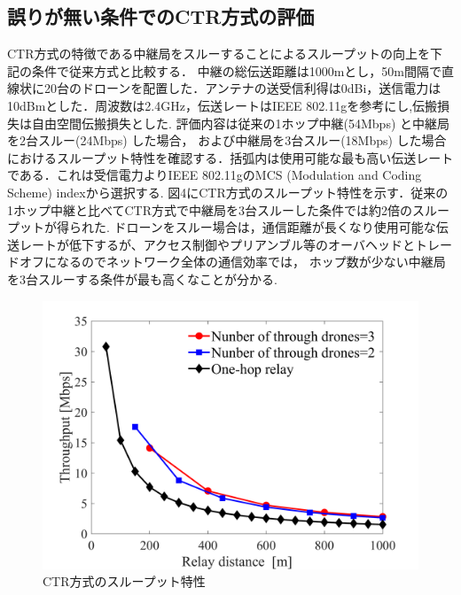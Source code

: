 \documentclass[a4paper,10pt]{ltjsarticle}
\begin{document}
\subsection{誤りが無い条件でのCTR方式の評価}
CTR方式の特徴である中継局をスルーすることによるスループットの向上を下記の条件で従来方式と比較する．%
中継の総伝送距離は1000mとし，50m間隔で直線状に20台のドローンを配置した．アンテナの送受信利得は0dBi，送信電力は10dBmとした．周波数は2.4GHz，伝送レートはIEEE 802.11gを参考にし,伝搬損失は自由空間伝搬損失とした.
評価内容は従来の1ホップ中継(54Mbps) と中継局を2台スルー(24Mbps) した場合，
および中継局を3台スルー(18Mbps) した場合におけるスループット特性を確認する．括弧内は使用可能な最も高い伝送レートである．これは受信電力よりIEEE 802.11gのMCS (Modulation and Coding Scheme) indexから選択する.
図4にCTR方式のスループット特性を示す．従来の1ホップ中継と比べてCTR方式で中継局を3台スルーした条件では約2倍のスループットが得られた.
ドローンをスルー場合は，通信距離が長くなり使用可能な伝送レートが低下するが、アクセス制御やプリアンブル等のオーバヘッドとトレードオフになるのでネットワーク全体の通信効率では，
ホップ数が少ない中継局を3台スルーする条件が最も高くなことが分かる.
\begin{figure}[H]
  \centering
  \includegraphics[width=\linewidth]{throughtput_vs_placement_50m_max_distance_3.pdf} %
  \caption{CTR方式のスループット特性}
  \label{fig:throughput_through} %
\end{figure}
\end{document}
